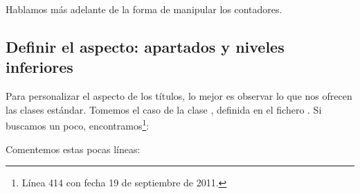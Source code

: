 \begin{plusloins}
Hablamos más adelante de la forma de manipular los contadores.
\end{plusloins}

\subsection{Definir el aspecto: apartados y niveles inferiores}\label{apparencetitre}

Para personalizar el aspecto de los títulos, lo mejor es observar lo que nos ofrecen las clases estándar. Tomemos el caso de la clase , definida en el fichero . Si buscamos un poco, encontramos\footnote{Línea 414 con fecha 19 de septiembre de 2011.}:

\begin{latexcode}
\newcommand\section{\@startsection {section}{1}{\z@}%
                             {-3.5ex \@plus -1ex \@minus -.2ex}%
                             {2.3ex \@plus.2ex}%
                             {\normalfont\Large\bfseries}}
\end{latexcode}

Comentemos estas pocas líneas:

